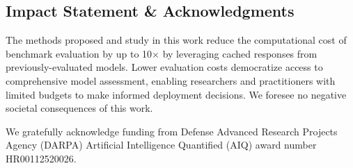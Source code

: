 \documentclass{article}
\begin{document}

\label{introduction}



\label{method}


\label{experiments}

\subsection*{Impact Statement \& Acknowledgments}
The methods proposed and study in this work reduce the computational cost of benchmark evaluation by up to 10$\times$ by leveraging cached responses from previously-evaluated models.
Lower evaluation costs democratize access to comprehensive model assessment, enabling researchers and practitioners with limited budgets to make informed deployment decisions.
We foresee no negative societal consequences of this work.

We gratefully acknowledge funding from Defense Advanced Research Projects Agency (DARPA) Artificial Intelligence Quantified (AIQ) award number HR00112520026.




\clearpage

\onecolumn

\appendix


\end{document}
